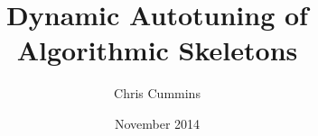 \title{Dynamic Autotuning of Algorithmic Skeletons}
\author{Chris Cummins}
\date{November 2014}




\maketitle



